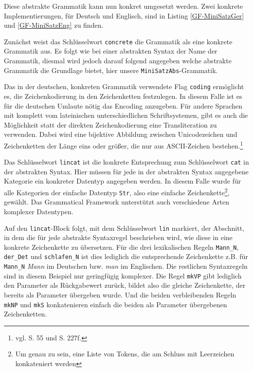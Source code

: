 \documentclass[12pt,abstract=on,titlepage,bibliography=totoc,ngerman,listof=totoc]{scrreprt}
\begin{document}

Diese abstrakte Grammatik kann nun konkret umgesetzt werden. Zwei konkrete Implementierungen, für Deutsch und Englisch, sind in Listing \ref{GF-MiniSatzGer} und \ref{GF-MiniSatzEng} zu finden. \par


Zunächst weist das Schlüsselwort \texttt{concrete} die Grammatik als eine konkrete Grammatik aus. Es folgt wie bei einer abstrakten Syntax der Name der Grammatik, diesmal wird jedoch darauf folgend angegeben welche abstrakte Grammatik die Grundlage bietet, hier unsere \texttt{MiniSatzAbs}-Grammatik. \par
Das in der deutschen, konkreten Grammatik verwendete Flag \texttt{coding} ermöglicht es, die Zeichenkodierung in den Zeichenketten festzulegen. In diesem Falle ist es für die deutschen Umlaute nötig das Encoding anzugeben. Für andere Sprachen mit komplett vom lateinischen unterschiedlichen Schriftsystemen, gibt es auch die Möglichkeit statt der direkten Zeichenkodierung eine Transliteration zu verwenden. Dabei wird eine bijektive Abbildung zwischen Unicodezeichen und Zeichenketten der Länge eins oder größer, die nur aus ASCII-Zeichen bestehen.\footnote{vgl. \cite{RANTA2011} S. 55 und S. 227f.} \par
Das Schlüsselwort \texttt{lincat} ist die konkrete Entsprechung zum Schlüsselwort \texttt{cat} in der abstrakten Syntax. Hier müssen für jede in der abstrakten Syntax angegebene Kategorie ein konkreter Datentyp angegeben werden. In diesem Falle wurde für alle Kategorien der einfache Datentyp \texttt{Str}, also eine einfache Zeichenkette\footnote{Um genau zu sein, eine Liste von Tokens, die am Schluss mit Leerzeichen konkateniert werden}, gewählt. Das Grammatical Framework unterstützt auch verschiedene Arten komplexer Datentypen. \par
Auf den \texttt{lincat}-Block folgt, mit dem Schlüsselwort \texttt{lin} markiert, der Abschnitt, in dem die für jede abstrakte Syntaxregel beschrieben wird, wie diese in eine konkrete Zeichenkette zu übersetzen. Für die drei lexikalischen Regeln \texttt{Mann\_N}, \texttt{der\_Det} und \texttt{schlafen\_N} ist dies lediglich die entsprechende Zeichenkette z.B. für \texttt{Mann\_N} \textit{Mann} im Deutschen bzw. \textit{man} im Englischen. Die restlichen Syntaxregeln sind in diesem Beispiel nur geringfügig komplexer. Die Regel \texttt{mkVP} gibt lediglich den Parameter als Rückgabewert zurück, bildet also die gleiche Zeichenkette, der bereits als Parameter übergeben wurde. Und die beiden verbleibenden Regeln \texttt{mkNP} und \texttt{mkS} konkatenieren einfach die beiden als Parameter übergebenen Zeichenketten. \par
\end{document}
